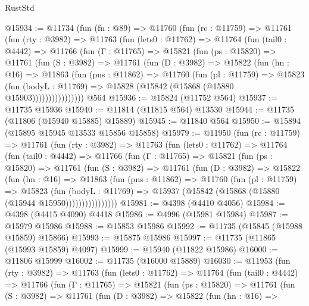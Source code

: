 \begin{lexlean}{RustStd}
\begin{coremodule}
@15934 := @11734
    (fun (fn : @89) =>
    @11760
      (fun (rc : @11759) =>
      @11761
        (fun (rty : @3982) =>
        @11763
          (fun (lets0 : @11762) =>
          @11764
            (fun (tail0 : @4442) =>
            @11766
              (fun (Γ : @11765) =>
              @15821
                (fun (ps : @15820) =>
                @11761
                  (fun (S : @3982) =>
                  @11761
                    (fun (D : @3982) =>
                    @15822
                      (fun (hn : @16) =>
                      @11863
                        (fun (pns : @11862) =>
                        @11760
                          (fun (pl : @11759) =>
                          @15823
                            (fun (bodyL : @11769) =>
                            @15828 (@15842 (@15868 (@15880 @15903))))))))))))))))
    @564
@15936 := @15824 (@11752 @564)
@15937 := @11735 @15936
@15940 := @11814 (@11815 @564) @13530
@15944 := @11735 (@11806 (@15940 @15885) @15889)
@15945 := @11840 @564
@15950 := @15894 (@15895 @15945 @13533 @15856 @15858)
@15979 := @11950
    (fun (rc : @11759) =>
    @11761
      (fun (rty : @3982) =>
      @11763
        (fun (lets0 : @11762) =>
        @11764
          (fun (tail0 : @4442) =>
          @11766
            (fun (Γ : @11765) =>
            @15821
              (fun (ps : @15820) =>
              @11761
                (fun (S : @3982) =>
                @11761
                  (fun (D : @3982) =>
                  @15822
                    (fun (hn : @16) =>
                    @11863
                      (fun (pns : @11862) =>
                      @11760
                        (fun (pl : @11759) =>
                        @15823
                          (fun (bodyL : @11769) =>
                          @15937 (@15842 (@15868 (@15880 (@15944 @15950))))))))))))))))
@15981 := @4398 (@4410 @4056)
@15984 := @4398 (@4415 @4090) @4418
@15986 := @4996 (@15981 @15984)
@15987 := @15979 @15986
@15988 := @15853 @15986
@15992 := @11735 (@15845 (@15988 @15859) @15866)
@15993 := @15875 @15986
@15997 := @11735 (@11865 (@15993 @15859) @4097)
@15999 := @15940 (@11822 @15986)
@16000 := @11806 @15999
@16002 := @11735 (@16000 @15889)
@16030 := @11953
    (fun (rty : @3982) =>
    @11763
      (fun (lets0 : @11762) =>
      @11764
        (fun (tail0 : @4442) =>
        @11766
          (fun (Γ : @11765) =>
          @15821
            (fun (ps : @15820) =>
            @11761
              (fun (S : @3982) =>
              @11761
                (fun (D : @3982) =>
                @15822
                  (fun (hn : @16) =>

\end{coremodule}
\end{lexlean}
